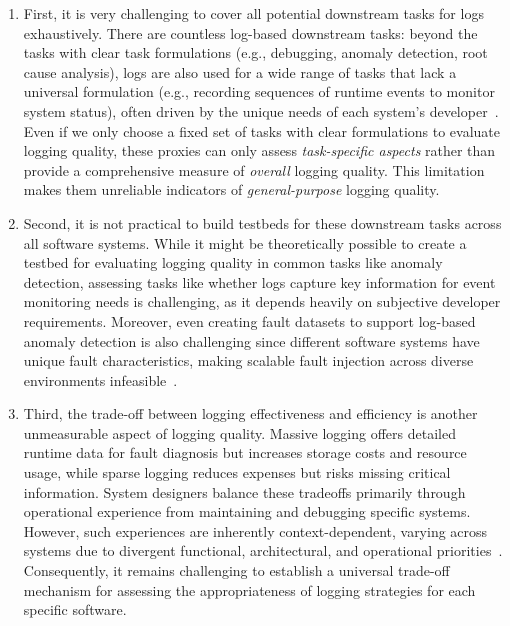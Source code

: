 \begin{enumerate}
    \item First, it is very challenging to cover all potential downstream tasks for logs exhaustively. There are countless log-based downstream tasks: beyond the tasks with clear task formulations (e.g., debugging, anomaly detection, root cause analysis), logs are also used for a wide range of tasks that lack a universal formulation (e.g., recording sequences of runtime events to monitor system status), often driven by the unique needs of each system’s developer~\cite{Zhang2019RobustLA, xu2024divlog, Amar2019MiningHT}. Even if we only choose a fixed set of tasks with clear formulations to evaluate logging quality, these proxies can only assess \textit{task-specific aspects} rather than provide a comprehensive measure of \textit{overall} logging quality. This limitation makes them unreliable indicators of \textit{general-purpose} logging quality.
    \item  Second, it is not practical to build testbeds for these downstream tasks across all software systems. While it might be theoretically possible to create a testbed for evaluating logging quality in common tasks like anomaly detection, assessing tasks like whether logs capture key information for event monitoring needs is challenging, as it depends heavily on subjective developer requirements. Moreover, even creating fault datasets to support log-based anomaly detection is also challenging since different software systems have unique fault characteristics, making scalable fault injection across diverse environments infeasible~\cite{zhao_identifying_2021}.
    \item Third, the trade-off between logging effectiveness and efficiency is another unmeasurable aspect of logging quality. Massive logging offers detailed runtime data for fault diagnosis but increases storage costs and resource usage, while sparse logging reduces expenses but risks missing critical information. System designers balance these tradeoffs primarily through operational experience from maintaining and debugging specific systems. However, such experiences are inherently context-dependent, varying across systems due to divergent functional, architectural, and operational priorities~\cite{rong2023developers}. Consequently, it remains challenging to establish a universal trade-off mechanism for assessing the appropriateness of logging strategies for each specific software.

\end{enumerate}
